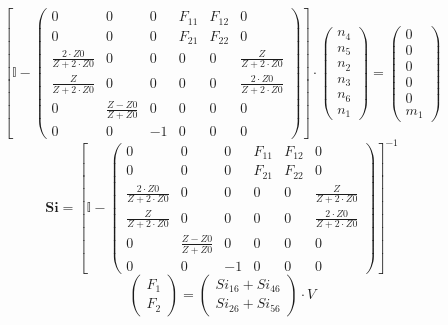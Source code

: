 \documentclass[10pt]{article} \usepackage{amsmath} \usepackage{bbold}
\begin{document}
\[ \left[ \mathbb{I}  - \left(\begin{smallmatrix} 0 & 0 & 0 & F_{11} &
F_{12} & 0 \\ 0 & 0 & 0 & F_{21} & F_{22} & 0 \\ \frac{2\cdot
Z0}{Z+2\cdot Z0} & 0 & 0 & 0 & 0 & \frac{Z}{Z+2\cdot Z0} \\
\frac{Z}{Z+2\cdot Z0} & 0 & 0 & 0 & 0 & \frac{2\cdot Z0}{Z+2\cdot Z0}
\\ 0 & \frac{ Z -Z0}{ Z +Z0} & 0 & 0 & 0 & 0 \\ 0 & 0 & -1 & 0 & 0 & 0
\end{smallmatrix}\right)\right] \cdot \left(\begin{smallmatrix} n_{4}
\\ n_{5} \\ n_{2} \\ n_{3} \\ n_{6} \\ n_{1} \end{smallmatrix}\right)
= \left(\begin{smallmatrix} 0 \\ 0 \\ 0 \\ 0 \\ 0 \\ m_{1}
\end{smallmatrix}\right) \]
\[ \mathbf{Si} = \left[ \mathbb{I}  - \left(\begin{smallmatrix} 0 & 0
& 0 & F_{11} & F_{12} & 0 \\ 0 & 0 & 0 & F_{21} & F_{22} & 0 \\
\frac{2\cdot Z0}{Z+2\cdot Z0} & 0 & 0 & 0 & 0 & \frac{Z}{Z+2\cdot Z0}
\\ \frac{Z}{Z+2\cdot Z0} & 0 & 0 & 0 & 0 & \frac{2\cdot Z0}{Z+2\cdot
Z0} \\ 0 & \frac{ Z -Z0}{ Z +Z0} & 0 & 0 & 0 & 0 \\ 0 & 0 & -1 & 0 & 0
& 0 \end{smallmatrix}\right) \right]^{-1} \]
\[ \left(\begin{array}{c} F_{1} \\ F_{2}
\end{array}\right)=\left(\begin{smallmatrix} Si_{16} + Si_{46} \\
Si_{26} + Si_{56} \end{smallmatrix}\right)\cdot V \]
\end{document}

